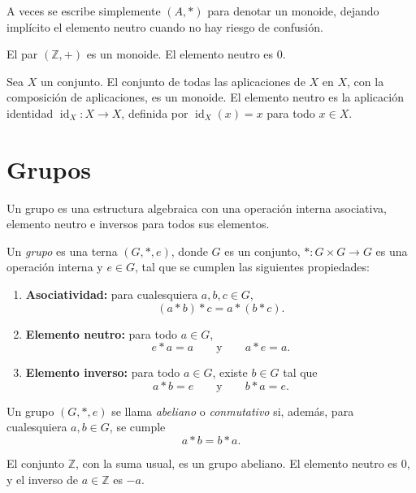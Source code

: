 A veces se escribe simplemente \((A,*)\) para denotar un monoide, dejando implícito el elemento neutro cuando no hay riesgo de confusión.

\begin{ejemplo}
El par \((\mathbb{Z},+)\) es un monoide. El elemento neutro es \(0\).
\end{ejemplo}

\begin{ejemplo}
Sea \(X\) un conjunto. El conjunto de todas las aplicaciones de \(X\) en \(X\), con la composición de aplicaciones, es un monoide. El elemento neutro es la aplicación identidad \(\operatorname{id}_X:X\to X\), definida por \(\operatorname{id}_X(x)=x\) para todo \(x\in X\).
\end{ejemplo}

\section{Grupos}

Un grupo es una estructura algebraica con una operación interna asociativa, elemento neutro e inversos para todos sus elementos.

\begin{definicion}[Grupo]
Un \emph{grupo} es una terna \((G,*,e)\), donde \(G\) es un conjunto, \(*:G\times G\to G\) es una operación interna y \(e\in G\), tal que se cumplen las siguientes propiedades:
\begin{enumerate}
  \item \textbf{Asociatividad:} para cualesquiera \(a,b,c\in G\),
  \[
    (a*b)*c=a*(b*c).
  \]
  \item \textbf{Elemento neutro:} para todo \(a\in G\),
  \[
    e*a=a
    \qquad\text{y}\qquad
    a*e=a.
  \]
  \item \textbf{Elemento inverso:} para todo \(a\in G\), existe \(b\in G\) tal que
  \[
    a*b=e
    \qquad\text{y}\qquad
    b*a=e.
  \]
\end{enumerate}
\end{definicion}

\begin{definicion}
Un grupo \((G,*,e)\) se llama \emph{abeliano} o \emph{conmutativo} si, además, para cualesquiera \(a,b\in G\), se cumple
\[
  a*b=b*a.
\]
\end{definicion}

\begin{ejemplo}
El conjunto \(\mathbb{Z}\), con la suma usual, es un grupo abeliano. El elemento neutro es \(0\), y el inverso de \(a\in\mathbb{Z}\) es \(-a\).
\end{ejemplo}

